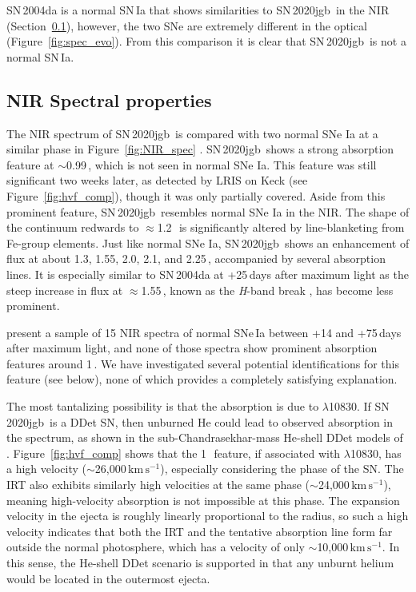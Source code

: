 \documentclass[twocolumn]{aastex631}
\newcommand{\sn}{SN\,2020jgb}
\newcommand{\kms}{$\mathrm{km}\,\mathrm{s}^{-1}$}
\begin{document}
SN\,2004da is a normal SN\,Ia that shows similarities to \sn\ in the NIR (Section~\ref{sec:NIR_spec}), however, the two SNe are extremely different in the optical (Figure~\ref{fig:spec_evo}). From this comparison it is clear that \sn\ is not a normal SN\,Ia. 

\subsection{NIR Spectral properties}
\label{sec:NIR_spec}
The NIR spectrum of \sn\ is compared with two normal SNe Ia at a similar phase in Figure~\ref{fig:NIR_spec} \citep[data for SNe\,2004ab and 2004da from][]{Marion2009_NIR}. \sn\ shows a strong absorption feature at $\sim$0.99\,\micron, which is not seen in normal SNe Ia. This feature was still significant two weeks later, as detected by LRIS on Keck (see Figure~\ref{fig:hvf_comp}), though it was only partially covered. Aside from this prominent feature, \sn\ resembles normal SNe Ia in the NIR. The shape of the continuum redwards to $\approx$1.2\,\micron\ is significantly altered by line-blanketing from Fe-group elements. Just like normal SNe Ia, \sn\ shows an enhancement of flux at about 1.3, 1.55, 2.0, 2.1, and 2.25\,\micron, accompanied by several  absorption lines. It is especially similar to SN\,2004da at +25\,days after maximum light as the steep increase in flux at $\approx$1.55\,\micron, known as the \textit{H}-band break \citep{Hsiao_CSP_2019}, has become less prominent.

\citet{Marion2009_NIR} present a sample of 15 NIR spectra of normal SNe\,Ia between +14 and +75\,days after maximum light, and none of those spectra show prominent absorption features around 1\,\micron. We have investigated several potential identifications for this feature (see below), none of which provides a completely satisfying explanation.

The most tantalizing possibility is that the absorption is due to  $\lambda$10830. If \sn\ is a DDet SN, then unburned He could lead to observed absorption in the spectrum, as shown in the sub-Chandrasekhar-mass He-shell DDet models of \citet{Boyle2017_Helium}. Figure~\ref{fig:hvf_comp} shows that the 1\,\micron\ feature, if associated with  $\lambda$10830, has a high velocity ($\sim$26,000\,\kms), especially considering the phase of the SN. The  IRT also exhibits similarly high velocities at the same phase ($\sim$24,000\,\kms), meaning high-velocity absorption is not impossible at this phase. The expansion velocity in the ejecta is roughly linearly proportional to the radius, so such a high velocity indicates that both the  IRT and the tentative  absorption line form far outside the normal photosphere, which has a velocity of only $\sim$10,000\,\kms. In this sense, the He-shell DDet scenario is supported in that any unburnt helium would be located in the outermost ejecta.
\end{document}
